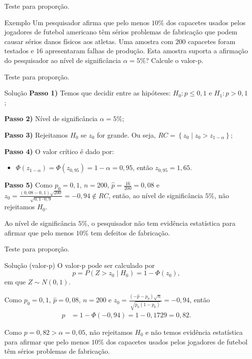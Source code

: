 \documentclass[8pt]{beamer}
\begin{document}
\begin{frame}{Teste para proporção.}

\large
\begin{block}{Exemplo}
	Um pesquisador afirma que pelo menos $10\%$ dos capacetes usados pelos jogadores de futebol americano têm sérios problemas de fabricação que podem causar sérios danos físicos aos atletas. Uma amostra com $200$ capacetes foram testados e $16$ apresentaram falhas de produção. Esta amostra suporta a afirmação do pesquisador ao nível de significância $\alpha=5\%$? Calcule o valor-p.
\end{block}

\normalsize
\end{frame}

\begin{frame}{Teste para proporção.}

\begin{block}{Solução}
	\textbf{Passo 1)} Temos que decidir entre as hipóteses: $H_0: p \leq 0,1$ e $H_1: p > 0,1$;
	
	\textbf{Passo 2)} Nível de significância $\alpha=5\%$;
	
	\textbf{Passo 3)} Rejeitamos $H_0$ se $ z_0  $ for grande. Ou seja, $RC=\left\{ z_0 \mid z_0 > z_{1-\alpha} \right\}$;
	
	\textbf{Passo 4)} O valor crítico é dado por:
	\begin{itemize}
		\item $\Phi\left(z_{1-\alpha}\right) = \Phi\left(z_{0,95}\right) = 1-\alpha=0,95$, então $z_{0,95} = 1,65$.
	\end{itemize}
	
	\textbf{Passo 5)} Como $p_0=0,1$, $n=200$, $\hat{p} = \frac{16}{200} = 0,08$ e $z_0 = \frac{(0,08 - 0,1)\sqrt{200}}{\sqrt{0,1 \cdot 0,9}} = -0,94 \not\in RC$, então, ao nível de significância $5\%$, não rejeitamos $H_0$.
	
	Ao nível de significância $5\%$, o pesquisador não tem evidência estatística para afirmar que pelo menos $10\%$ tem defeitos de fabricação.
\end{block}

\end{frame}

\begin{frame}{Teste para proporção.}

\large
\begin{block}{Solução (valor-p)}
	O valor-p pode ser calculado por
	$$p=P\left( Z > z_0  \mid H_0 \right) = 1 - \Phi\left(z_0\right),$$
	em que $Z\sim N(0,1)$.
	
	Como $p_0=0,1$, $\hat{p} = 0,08$, $n=200$ e $z_0=\frac{(-\hat{p} - p_0)\sqrt{n}}{\sqrt{p_0(1-p_0)}} = -0,94$, então
	\begin{align*}
		p &= 1 - \Phi\left( -0,94 \right) = 1 - 0,1729 = 0,82.
	\end{align*}
	
	Como $p=0,82 > \alpha=0,05$, não rejeitamos $H_0$ e não temos evidência estatística para afirmar que pelo menos $10\%$ dos capacetes usados pelos jogadores de futebol têm sérios problemas de fabricação.
\end{block}
\normalsize

\end{frame}
\end{document}
